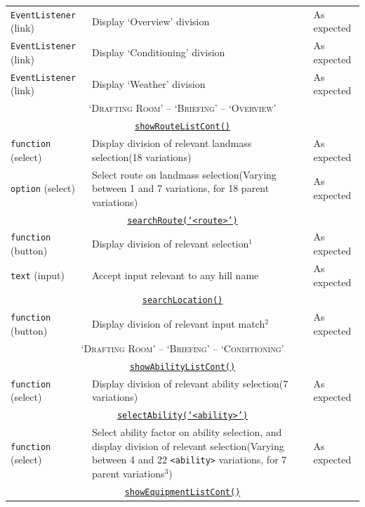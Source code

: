 \documentclass[11pt, english]{article}
\begin{document}
\begin{center}
\begin{longtable}{p{3cm}p{8cm}p{2cm}}
		\hline
		\texttt{EventListener} (link) & Display `Overview' division & As expected\\
		\texttt{EventListener} (link) & Display `Conditioning' division & As expected\\
		\texttt{EventListener} (link) & Display `Weather' division & As expected\\
		\hline
		\multicolumn{3}{c}{\textsc{`Drafting Room' -- `Briefing' -- `Overview'}}\\
		\hline
		\multicolumn{3}{c}{\underline{\texttt{showRouteListCont()}}}\\
		\texttt{function} (select) & Display division of relevant landmass selection\newline (18 variations) & As expected\\
		\texttt{option} (select) & Select route on landmass selection\newline (Varying between 1 and 7 variations, for 18 parent variations) & As expected\\
		\multicolumn{3}{c}{\underline{\texttt{searchRoute(`<route>')}}}\\
		\texttt{function} (button) & Display division of relevant selection$^{1}$ & As expected\\
		\texttt{text} (input) & Accept input relevant to any hill name & As expected\\
		\multicolumn{3}{c}{\underline{\texttt{searchLocation()}}}\\
		\texttt{function} (button) & Display division of relevant input match$^{2}$ & As expected\\
		\hline
		\multicolumn{3}{c}{\textsc{`Drafting Room' -- `Briefing' -- `Conditioning'}}\\
		\hline
		\multicolumn{3}{c}{\underline{\texttt{showAbilityListCont()}}}\\
		\texttt{function} (select) & Display division of relevant ability selection\newline (7 variations) & As expected\\
		\multicolumn{3}{c}{\underline{\texttt{selectAbility(`<ability>')}}}\\
		\texttt{function} (select) & Select ability factor on ability selection, and display division of relevant selection\newline (Varying between 4 and 22 \texttt{<ability>} variations, for 7 parent variations$^{3}$) & As expected\\
		\multicolumn{3}{c}{\underline{\texttt{showEquipmentListCont()}}}\\

\end{longtable}
\end{center}
\end{document}
